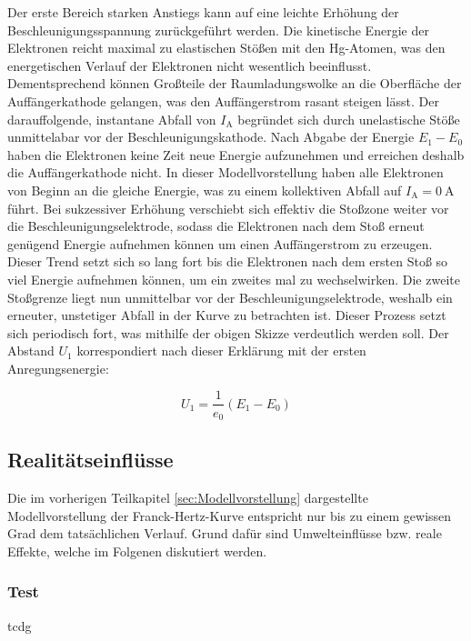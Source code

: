 \noindent Der erste Bereich starken Anstiegs kann auf eine leichte Erhöhung der Beschleunigungsspannung zurückgeführt werden. Die kinetische Energie der 
Elektronen reicht maximal zu elastischen Stößen mit den Hg-Atomen, was den energetischen Verlauf der Elektronen nicht wesentlich beeinflusst. Dementsprechend 
können Großteile der Raumladungswolke an die Oberfläche der Auffängerkathode gelangen, was den Auffängerstrom rasant steigen lässt. Der darauffolgende,
instantane Abfall von $I_\text{A}$ begründet sich durch unelastische Stöße unmittelabar vor der Beschleunigungskathode. Nach Abgabe der Energie $E_1 - E_0$
haben die Elektronen keine Zeit neue Energie aufzunehmen und erreichen deshalb die Auffängerkathode nicht. In dieser Modellvorstellung haben alle Elektronen 
von Beginn an die gleiche Energie, was zu einem kollektiven Abfall auf $I_\text{A} = \qty{0}{\ampere}$ führt. Bei sukzessiver Erhöhung verschiebt sich effektiv 
die Stoßzone weiter vor die Beschleunigungselektrode, sodass die Elektronen nach dem Stoß erneut genügend Energie aufnehmen können um einen Auffängerstrom 
zu erzeugen. Dieser Trend setzt sich so lang fort bis die Elektronen nach dem ersten Stoß so viel Energie aufnehmen können, um ein zweites mal zu wechselwirken.
Die zweite Stoßgrenze liegt nun unmittelbar vor der Beschleunigungselektrode, weshalb ein erneuter, unstetiger Abfall in der Kurve zu betrachten ist. Dieser 
Prozess setzt sich periodisch fort, was mithilfe der obigen Skizze verdeutlich werden soll. Der Abstand $U_1$ korrespondiert nach dieser Erklärung mit 
der ersten Anregungsenergie:

\begin{equation*}
    U_1 = \frac{1}{e_0}\left(E_1 - E_0\right)
\end{equation*}

\subsection{Realitätseinflüsse}
\label{sec:Realitaetseinfluesse}

Die im vorherigen Teilkapitel \ref{sec:Modellvorstellung} dargestellte Modellvorstellung der Franck-Hertz-Kurve entspricht nur bis zu einem gewissen Grad dem 
tatsächlichen Verlauf. Grund dafür sind Umwelteinflüsse bzw. reale Effekte, welche im Folgenen diskutiert werden.\\

\subsubsection*{Test}

tcdg






